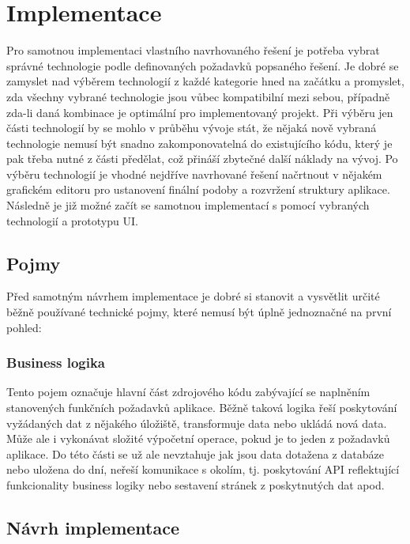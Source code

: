 \section{Implementace}

Pro samotnou implementaci vlastního navrhovaného řešení je potřeba vybrat správné technologie podle definovaných požadavků
popsaného řešení.
Je dobré se zamyslet nad výběrem technologií z každé kategorie hned na začátku a promyslet, zda všechny vybrané technologie
jsou vůbec kompatibilní mezi sebou, případně zda-li daná kombinace je optimální pro implementovaný projekt.
Při výběru jen části technologií by se mohlo v průběhu vývoje stát, že nějaká nově vybraná technologie nemusí být snadno
zakomponovatelná do existujícího kódu, který je pak třeba nutné z části předělat, což přináší zbytečné další náklady na vývoj.
Po výběru technologií je vhodné nejdříve navrhované řešení načrtnout v nějakém grafickém editoru pro ustanovení finální
podoby a rozvržení struktury aplikace.
Následně je již možné začít se samotnou implementací s pomocí vybraných technologií a prototypu \ac{UI}.

	\subsection{Pojmy}

	Před samotným návrhem implementace je dobré si stanovit a vysvětlit určité běžně používané technické pojmy, které
	nemusí být úplně jednoznačné na první pohled:

		\subsubsection{Business logika}

		Tento pojem označuje hlavní část zdrojového kódu zabývající se naplněním stanovených funkčních požadavků aplikace.
		Běžně taková logika řeší poskytování vyžádaných dat z nějakého úložiště, transformuje data nebo ukládá nová data.
		Může ale i vykonávat složité výpočetní operace, pokud je to jeden z požadavků aplikace.
		Do této části se už ale nevztahuje jak jsou data dotažena z databáze nebo uložena do dní, neřeší komunikace
		s okolím, tj. poskytování \ac{API} reflektující funkcionality business logiky nebo sestavení stránek z poskytnutých
		dat apod.

	\subsection{Návrh implementace}

